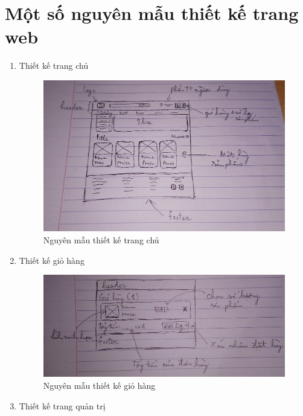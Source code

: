 \section{Một số nguyên mẫu thiết kế trang web}
\begin{enumerate}[label=\textbf{\alph*)}]
    \item Thiết kế trang chủ
        \begin{figure}[h!]
	        \centering
	        \includegraphics[width=\linewidth]{fig/p_home.jpg}
	        \caption{Nguyên mẫu thiết kế trang chủ}
        \end{figure}
    \item Thiết kế giỏ hàng
        \begin{figure}[h!]
            \centering
            \includegraphics[width=\linewidth]{fig/p_cart.jpg}
            \caption{Nguyên mẫu thiết kế giỏ hàng}
        \end{figure}
    \newpage
    \item Thiết kế trang quản trị
        \begin{figure}[h!]
            \centering

\end{figure}
\end{enumerate}
